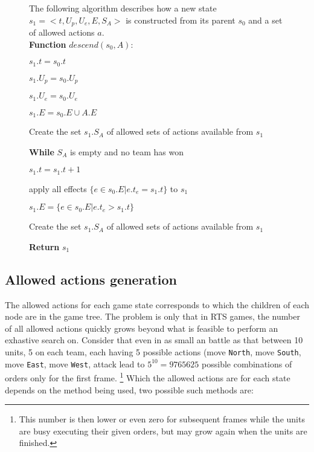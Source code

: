 \begin{figure}[h!t]
\begin{algorithm}
The following algorithm describes how a new state $s_1=<t,U_p,U_e,E,S_A>$ is constructed from its parent $s_0$ and a set of allowed actions $a$. \ \\

\textbf{Function} $descend(s_0,A)$:
\begin{enum}
\item $s_1.t = s_0.t$
\item $s_1.U_p = s_0.U_p$
\item $s_1.U_e = s_0.U_e$
\item $s_1.E = s_0.E \cup A.E$
\item Create the set $s_1.S_A$ of allowed sets of actions available from $s_1$

\item \textbf{While} $S_A$ is empty and no team has won
\begin{enum}
	\item $s_1.t = s_1.t + 1$
	\item apply all effects $\{e \in s_0.E | e.t_e = s_1.t\}$ to $s_1$
	\item $s_1.E = \{e \in s_0.E | e.t_e > s_1.t\}$
	\item Create the set $s_1.S_A$ of allowed sets of actions available from $s_1$
\end{enum}

\item \textbf{Return} $s_1$

\end{enum}
\label{algGeneration}
\end{algorithm}
\end{figure}



\subsection{Allowed actions generation}
The allowed actions for each game state corresponds to which the children of each node are in the game tree.
The problem is only that in RTS games, the number of all allowed actions quickly grows beyond what is feasible to perform an exhastive search on.
Consider that even in as small an battle as that between 10 units, 5 on each team, each having 5 possible actions
(move \texttt{North}, move \texttt{South}, move \texttt{East}, move \texttt{West}, attack
lead to $5^10 = 9765625$ possible combinations of orders only for the first frame.
\footnote{This number is then lower or even zero for subsequent frames while the units are busy executing their given orders, but may grow again when the units are finished.}
Which the allowed actions are for each state depends on the method being used, two possible such methods are:

